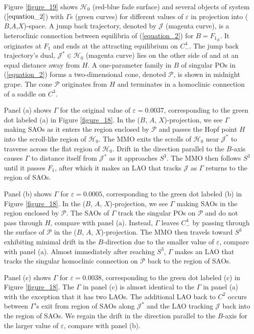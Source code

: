 \documentclass{ws-ijbc}
\begin{document}
Figure \ref{figure_19} shows $\mathscr{H}_0$ (red-blue fade surface) and several objects of system ($\ref{equation_2}$) with $\Gamma$s (green curves) for different values of $\varepsilon$ in projection into ($B$,$A$,$X$)-space.  A jump back trajectory, denoted by $\mathscr{J}$ (magenta curve), is a heteroclinic connection between equilibria of (\ref{equation_2}) for $B=F_{1_B}$.  It originates at $F_1$ and ends at the attracting equilibrium on $C^4_-$.  The jump back trajectory's dual, $\mathscr{J}^* \in \mathscr{H}_0$ (magenta curve) lies on the other side of and at an equal distance away from $H$.  A one-parameter family in $B$ of singular POs in (\ref{equation_2}) forms a two-dimensional cone, denoted $\mathscr{P}$, is shown in midnight grape.  The cone $\mathscr{P}$ originates from $H$ and terminates in a homoclinic connection of a saddle on $C^3$.  

Panel (a) shows $\Gamma$ for the original value of $\varepsilon=0.0037$, corresponding to the green dot labeled (a) in Figure \ref{figure_18}.  In the ($B$, $A$, $X$)-projection, we see $\Gamma$ making SAOs as it enters the region enclosed by $\mathscr{P}$ and passes the Hopf point $H$ into the scroll-like region of $\mathscr{H}_0$.  The MMO exits the scrolls of $\mathscr{H}_0$ near $\mathscr{J}^*$ to traverse across the flat region of $\mathscr{H}_0$.  Drift in the direction parallel to the $B$-axis causes $\Gamma$ to distance itself from $\mathscr{J}^*$ as it approaches $S^3$.  The MMO then follows $S^3$ until it passes $F_1$, after which it makes an LAO that tracks $\mathscr{J}$ as $\Gamma$ returns to the region of SAOs.

Panel (b) shows $\Gamma$ for $\varepsilon=0.0005$, corresponding to the green dot labeled (b) in Figure \ref{figure_18}.  In the ($B$, $A$, $X$)-projection, we see $\Gamma$ making SAOs in the region enclosed by $\mathscr{P}$.  The SAOs of $\Gamma$ track the singular POs on $\mathscr{P}$ and do not pass through $H$, compare with panel (a).  Instead, $\Gamma$ leaves $C^4_-$ by passing through the surface of $\mathscr{P}$ in the ($B$, $A$, $X$)-projection.  The MMO then travels toward $S^3$ exhibiting minimal drift in the $B$-direction due to the smaller value of $\varepsilon$, compare with panel (a).  Almost immediately after reaching $S^3$, $\Gamma$ makes an LAO that tracks the singular homoclinic connection on $\mathscr{P}$ back to the region of SAOs.

Panel (c) shows $\Gamma$ for $\varepsilon=0.0038$, corresponding to the green dot labeled (c) in Figure \ref{figure_18}. The $\Gamma$ in panel (c) is almost identical to the $\Gamma$ in panel (a) with the exception that it has two LAOs.  The additional LAO back to $C^2$ occurs between $\Gamma$'s exit from region of SAOs along $\mathscr{J}^*$ and the LAO tracking $\mathscr{J}$ back into the region of SAOs.  We regain the drift in the direction parallel to the $B$-axis for the larger value of $\varepsilon$, compare with panel (b).
\end{document}
